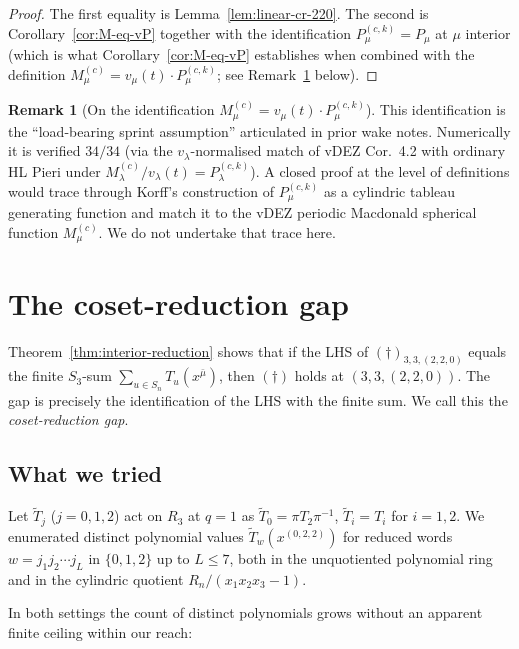 \documentclass[11pt]{article}
\theoremstyle{definition}
\newtheorem{remark}[theorem]{Remark}
\newcommand{\bmu}{\bar{\mu}}
\newcommand{\wt}[1]{\widetilde{#1}}
\newcommand{\Sn}{S_n}
\newcommand{\dgg}{\dagger}
\newcommand{\Rn}{R_n}
\begin{document}
\begin{proof}
The first equality is Lemma~\ref{lem:linear-cr-220}. The second is
Corollary~\ref{cor:M-eq-vP} together with the identification
$P^{(c,k)}_\mu = P_\mu$ at $\mu$ interior (which is what
Corollary~\ref{cor:M-eq-vP} establishes when combined with the definition
$M^{(c)}_\mu = v_\mu(t) \cdot P^{(c,k)}_\mu$; see
Remark~\ref{rem:M-vs-P-identification} below).
\end{proof}

\begin{remark}[On the identification $M^{(c)}_\mu = v_\mu(t) \cdot P^{(c,k)}_\mu$]
\label{rem:M-vs-P-identification}
This identification is the ``load-bearing sprint assumption'' articulated in
prior wake notes. Numerically it is verified $34/34$ (via the
$v_\lambda$-normalised match of vDEZ Cor.~4.2 with ordinary HL Pieri under
$M^{(c)}_\lambda / v_\lambda(t) = P^{(c,k)}_\lambda$).
A closed proof at the level of definitions would trace through
Korff's construction \cite{Korff2013} of $P^{(c,k)}_\mu$ as a cylindric
tableau generating function and match it to the vDEZ periodic Macdonald
spherical function $M^{(c)}_\mu$. We do not undertake that trace here.
\end{remark}

\section{The coset-reduction gap}
\label{sec:gap}

Theorem~\ref{thm:interior-reduction} shows that if the LHS of
$(\dgg)_{3,3,(2,2,0)}$ equals the finite $S_3$-sum
$\sum_{u \in \Sn} T_u(x^\bmu)$, then $(\dgg)$ holds at $(3, 3, (2,2,0))$.
The gap is precisely the identification of the LHS with the finite sum.
We call this the \emph{coset-reduction gap}.

\subsection{What we tried}
\label{ssec:tried}

Let $\wt T_j$ ($j = 0, 1, 2$) act on $R_3$ at $q = 1$ as
$\wt T_0 = \pi T_2 \pi^{-1}$, $\wt T_i = T_i$ for $i = 1, 2$. We enumerated
distinct polynomial values $\wt T_w(x^{(0,2,2)})$ for reduced words
$w = j_1 j_2 \cdots j_L$ in $\{0, 1, 2\}$ up to $L \le 7$, both in the
unquotiented polynomial ring and in the cylindric quotient
$\Rn / (x_1 x_2 x_3 - 1)$.

In both settings the count of distinct polynomials grows without an
apparent finite ceiling within our reach:
\end{document}
